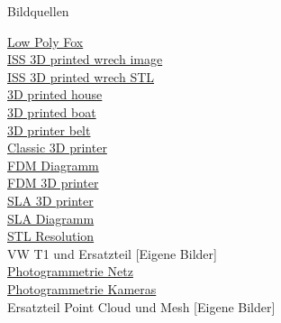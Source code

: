 \begin{frame}{Bildquellen}

\begin{minipage}[t]{0.49\textwidth}
    \small \href{https://www.thingiverse.com/thing:937740}{Low Poly Fox}\\
    \small \href{https://www.nasa.gov/mission_pages/station/research/news/3Dratchet_wrench}{ISS 3D printed wrech image}\\
    \small \href{https://nasa3d.arc.nasa.gov/detail/wrench-mis}{ISS 3D printed wrech STL}\\
    \small \href{https://www.aniwaa.com/buyers-guide/3d-printers/house-3d-printer-construction/}{3D printed house}\\
    \small \href{https://singularityhub.com/wp-content/uploads/2019/11/3d-printed-boat-3dirigo-1068x601.jpg}{3D printed boat}\\
    \small \href{https://www.coolthings.com/creality-cr-30-3dprintmill-3d-printer-conveyor-belt/}{3D printer belt}\\
    \small \href{https://3dandprint.eu/de/3d-drucker/3d-drucker-easythreed-nano/}{Classic 3D printer}\\
    \small \href{https://www.researchgate.net/figure/Schematic-of-an-FDM-3D-printer-Reproduced-with-permission-from-12_fig1_292985550}{FDM Diagramm}\\
    \small \href{https://www.amazon.de/Creality-Motherboard-Meanwell-Carborundum-220x220x250mm/dp/B07FFTHMMN}{FDM 3D printer}\\
    \small \href{https://www.3dnatives.com/de/stereolithografie/}{SLA 3D printer}\\
    \small \href{https://3druck.com/glossar/sla/}{SLA Diagramm}\\
    \small \href{https://additivemanufacturingindia.blogspot.com/2018/04/cad-conversion-and-stl-file-in-additive.html}{STL Resolution}\\
    \small VW T1 und Ersatzteil [Eigene Bilder]\\
    \small \href{https://www.gamestar.de/videos/photogrammetrie-wie-macht-man-spiele-photorealistisch,94973.html}{Photogrammetrie Netz}\\
    \small \href{https://www.researchgate.net/figure/Structure-from-Motion-SfM-process-is-illustrated-The-structure-in-the_fig2_269327935}{Photogrammetrie Kameras}\\
    \small Ersatzteil Point Cloud und Mesh [Eigene Bilder]\\
\end{minipage}

\end{frame}
